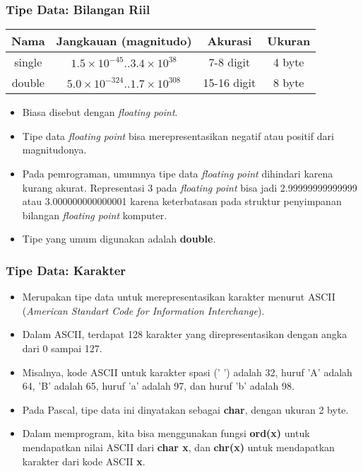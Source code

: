 \documentclass{beamer}
\begin{document}
\begin{frame}
\frametitle{Tipe Data: Bilangan Riil}
\begin{table}[ht]
	\begin{tabular}{|c|c|c|c|}
		\hline Nama  & Jangkauan (magnitudo) & Akurasi & Ukuran \\ 
		\hline single & $1.5\times10^{-45} .. 3.4\times10^{38}$ & 7-8 digit & 4 byte\\ 
		\hline double & $5.0\times10^{-324} .. 1.7\times10^{308}$ & 15-16 digit & 8 byte \\ 
		\hline 
	\end{tabular}
\end{table} 
\begin{itemize}
	\item Biasa disebut dengan \alert{\textit{floating point}}.
	\item Tipe data \textit{floating point} bisa merepresentasikan negatif atau positif dari magnitudonya.
	\item Pada pemrograman, umumnya tipe data \textit{floating point} dihindari karena kurang akurat. Representasi 3 pada \textit{floating point} bisa jadi 2.99999999999999 atau 3.000000000000001 karena keterbatasan pada struktur penyimpanan bilangan \textit{floating point} komputer.
	\item Tipe yang umum digunakan adalah \alert{\textbf{double}}.
\end{itemize}
\end{frame}

\begin{frame}
\frametitle{Tipe Data: Karakter}
\begin{itemize}
	\item Merupakan tipe data untuk merepresentasikan karakter menurut ASCII (\textit{American Standart Code for Information Interchange}).
	\item Dalam ASCII, terdapat 128 karakter yang direpresentasikan dengan angka dari 0 sampai 127. 
	\item Misalnya, kode ASCII untuk karakter spasi (' ') adalah 32, huruf 'A' adalah 64, 'B' adalah 65, huruf 'a' adalah 97, dan huruf 'b' adalah 98.
	\item Pada Pascal, tipe data ini dinyatakan sebagai \alert{\textbf{char}}, dengan ukuran 2 byte.
	\item Dalam memprogram, kita bisa menggunakan fungsi \textbf{ord(x)} untuk mendapatkan nilai ASCII dari \textbf{char x}, dan \textbf{chr(x)} untuk mendapatkan karakter dari kode ASCII \textbf{x}.
\end{itemize}
\end{frame}
\end{document}
